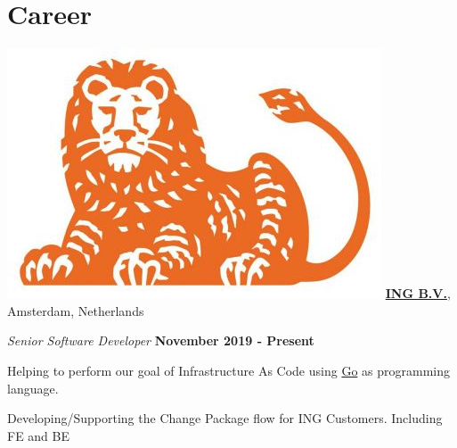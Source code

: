\section{Career}
%
\includegraphics[scale=0.1]{companies/ing} \href{https://www.ing.nl/}{\textbf{ING B.V.}},
Amsterdam, Netherlands
\begin{outerlist}
        \item[] \textit{Senior Software Developer}%
        \hfill \textbf{November 2019 - Present}

        \begin{innerlist}
                \item Helping to perform our goal of Infrastructure As Code using \href{https://go.dev/}{Go} as programming language.

                \item Developing/Supporting the Change Package flow for ING Customers.
                Including FE and BE

        \end{innerlist}

\end{outerlist}


